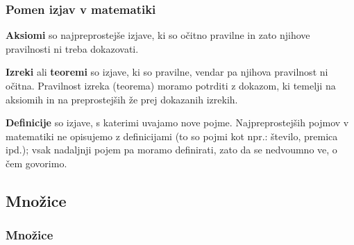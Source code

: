         \begin{frame}
            \frametitle{Pomen izjav v matematiki}
            \begin{block}{}
                \textbf{Aksiomi} so najpreprostejše izjave, ki so očitno pravilne in zato njihove 
                pravilnosti ni treba dokazovati.
            \end{block}
            \begin{block}{}
                \textbf{Izreki} ali \textbf{teoremi} so izjave, ki so pravilne, vendar pa njihova 
                pravilnost ni očitna. 
                Pravilnost izreka (teorema) moramo potrditi z dokazom, ki temelji na aksiomih in na 
                preprostejših že prej dokazanih izrekih.
            \end{block}
            \begin{block}{}
                \textbf{Definicije} so izjave, s katerimi uvajamo nove pojme. Najpreprostejših pojmov 
                v matematiki ne opisujemo z definicijami (to so pojmi kot npr.: število, premica ipd.); 
                vsak nadaljnji pojem pa moramo definirati, zato da se nedvoumno ve, o čem govorimo.
            \end{block}

        \end{frame}
        
    \subsection{Množice}

        \begin{frame}
            \frametitle{Množice}
        \end{frame}
